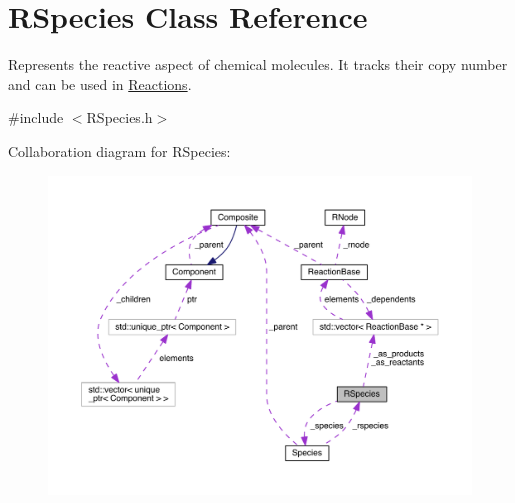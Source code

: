 \hypertarget{classRSpecies}{\section{R\+Species Class Reference}
\label{classRSpecies}
}


Represents the reactive aspect of chemical molecules. It tracks their copy number and can be used in \hyperlink{classReaction}{Reactions}.  




{\ttfamily \#include $<$R\+Species.\+h$>$}



Collaboration diagram for R\+Species\+:
\nopagebreak
\begin{figure}[H]
\begin{center}
\leavevmode
\includegraphics[width=350pt]{classRSpecies__coll__graph}
\end{center}
\end{figure}
